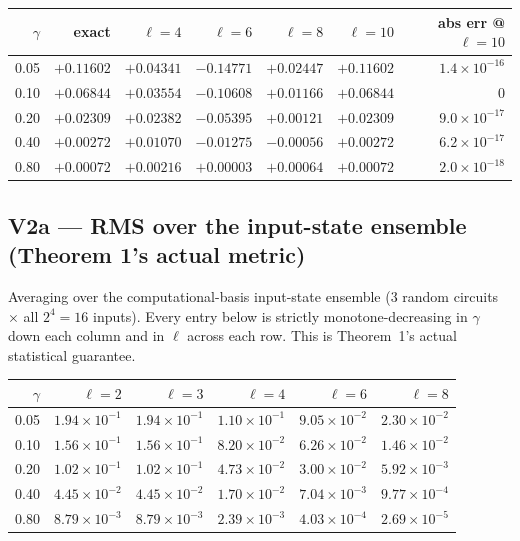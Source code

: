 \documentclass[11pt]{article}
\begin{document}
\begin{center}
\begin{tabular}{r|rrrrrr}
\toprule
$\gamma$ & exact & $\ell{=}4$ & $\ell{=}6$ & $\ell{=}8$ & $\ell{=}10$ & abs err @ $\ell{=}10$ \\
\midrule
0.05 & $+0.11602$ & $+0.04341$ & $-0.14771$ & $+0.02447$ & $+0.11602$ & $1.4{\times}10^{-16}$ \\
0.10 & $+0.06844$ & $+0.03554$ & $-0.10608$ & $+0.01166$ & $+0.06844$ & $0$ \\
0.20 & $+0.02309$ & $+0.02382$ & $-0.05395$ & $+0.00121$ & $+0.02309$ & $9.0{\times}10^{-17}$ \\
0.40 & $+0.00272$ & $+0.01070$ & $-0.01275$ & $-0.00056$ & $+0.00272$ & $6.2{\times}10^{-17}$ \\
0.80 & $+0.00072$ & $+0.00216$ & $+0.00003$ & $+0.00064$ & $+0.00072$ & $2.0{\times}10^{-18}$ \\
\bottomrule
\end{tabular}
\end{center}

\subsection{V2a --- RMS over the input-state ensemble (Theorem 1's actual metric)}
Averaging over the computational-basis input-state ensemble (3 random circuits
$\times$ all $2^4=16$ inputs).  Every entry below is strictly monotone-decreasing
in $\gamma$ down each column and in $\ell$ across each row.  This is Theorem~1's
actual statistical guarantee.

\begin{center}
\begin{tabular}{r|rrrrr}
\toprule
$\gamma$ & $\ell{=}2$ & $\ell{=}3$ & $\ell{=}4$ & $\ell{=}6$ & $\ell{=}8$ \\
\midrule
0.05 & $1.94{\times}10^{-1}$ & $1.94{\times}10^{-1}$ & $1.10{\times}10^{-1}$ & $9.05{\times}10^{-2}$ & $2.30{\times}10^{-2}$ \\
0.10 & $1.56{\times}10^{-1}$ & $1.56{\times}10^{-1}$ & $8.20{\times}10^{-2}$ & $6.26{\times}10^{-2}$ & $1.46{\times}10^{-2}$ \\
0.20 & $1.02{\times}10^{-1}$ & $1.02{\times}10^{-1}$ & $4.73{\times}10^{-2}$ & $3.00{\times}10^{-2}$ & $5.92{\times}10^{-3}$ \\
0.40 & $4.45{\times}10^{-2}$ & $4.45{\times}10^{-2}$ & $1.70{\times}10^{-2}$ & $7.04{\times}10^{-3}$ & $9.77{\times}10^{-4}$ \\
0.80 & $8.79{\times}10^{-3}$ & $8.79{\times}10^{-3}$ & $2.39{\times}10^{-3}$ & $4.03{\times}10^{-4}$ & $2.69{\times}10^{-5}$ \\
\bottomrule
\end{tabular}
\end{center}
\end{document}
